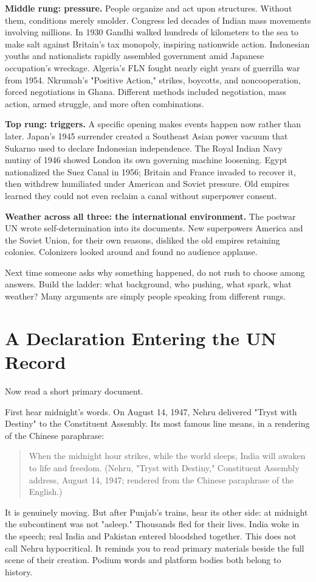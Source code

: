 \textbf{Middle rung: pressure.} People organize and act upon structures. Without them, conditions merely smolder. Congress led decades of Indian mass movements involving millions. In 1930 Gandhi walked hundreds of kilometers to the sea to make salt against Britain's tax monopoly, inspiring nationwide action. Indonesian youths and nationalists rapidly assembled government amid Japanese occupation's wreckage. Algeria's FLN fought nearly eight years of guerrilla war from 1954. Nkrumah's "Positive Action," strikes, boycotts, and noncooperation, forced negotiations in Ghana. Different methods included negotiation, mass action, armed struggle, and more often combinations.

\textbf{Top rung: triggers.} A specific opening makes events happen now rather than later. Japan's 1945 surrender created a Southeast Asian power vacuum that Sukarno used to declare Indonesian independence. The Royal Indian Navy mutiny of 1946 showed London its own governing machine loosening. Egypt nationalized the Suez Canal in 1956; Britain and France invaded to recover it, then withdrew humiliated under American and Soviet pressure. Old empires learned they could not even reclaim a canal without superpower consent.

\textbf{Weather across all three: the international environment.} The postwar UN wrote self-determination into its documents. New superpowers America and the Soviet Union, for their own reasons, disliked the old empires retaining colonies. Colonizers looked around and found no audience applause.

Next time someone asks why something happened, do not rush to choose among answers. Build the ladder: what background, who pushing, what spark, what weather? Many arguments are simply people speaking from different rungs.

\section{A Declaration Entering the UN Record}
Now read a short primary document.

First hear midnight's words. On August 14, 1947, Nehru delivered "Tryst with Destiny" to the Constituent Assembly. Its most famous line means, in a rendering of the Chinese paraphrase:

\begin{quote}
When the midnight hour strikes, while the world sleeps, India will awaken to life and freedom. (Nehru, "Tryst with Destiny," Constituent Assembly address, August 14, 1947; rendered from the Chinese paraphrase of the English.)
\end{quote}
It is genuinely moving. But after Punjab's trains, hear its other side: at midnight the subcontinent was not "asleep." Thousands fled for their lives. India woke in the speech; real India and Pakistan entered bloodshed together. This does not call Nehru hypocritical. It reminds you to read primary materials beside the full scene of their creation. Podium words and platform bodies both belong to history.

